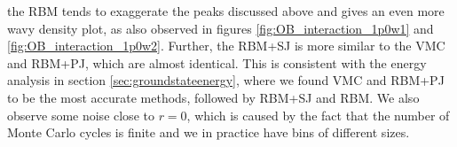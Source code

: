 \noindent
the RBM tends to exaggerate the peaks discussed above and gives an even more wavy density plot, as also observed in figures \eqref{fig:OB_interaction_1p0w1} and \eqref{fig:OB_interaction_1p0w2}. Further, the RBM+SJ is more similar to the VMC and RBM+PJ, which are almost identical. This is consistent with the energy analysis in section \ref{sec:groundstateenergy}, where we found VMC and RBM+PJ to be the most accurate methods, followed by RBM+SJ and RBM. We also observe some noise close to $r=0$, which is caused by the fact that the number of Monte Carlo cycles is finite and we in practice have bins of different sizes.

\begin{figure}
	\centering
	\captionsetup[subfigure]{labelformat=empty}
	\hspace{0.1cm}
	\hspace{-0.5cm}
	\\
	

\end{figure}
